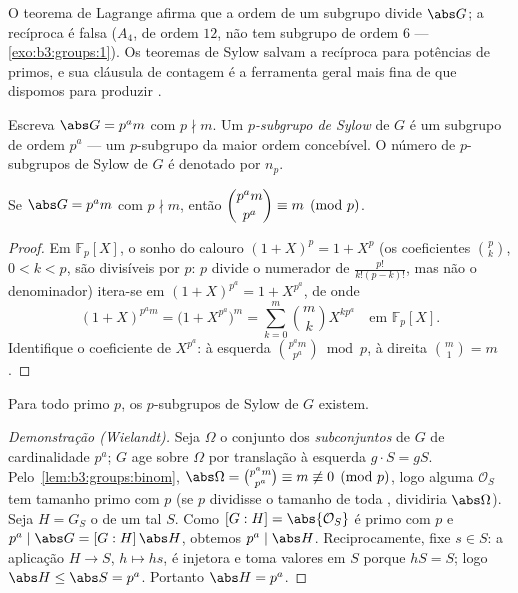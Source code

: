 O teorema de Lagrange afirma que a ordem de um subgrupo divide
$\abs G$; a recíproca é falsa ($A_4$, de ordem $12$, não
tem subgrupo de ordem $6$ --- \cref{exo:b3:groups:1}). Os teoremas de Sylow
salvam a recíproca para potências de primos, e sua cláusula de contagem
é a ferramenta geral mais fina de que dispomos para produzir .

\begin{definition}\label{def:b3:groups:sylow}
Escreva $\abs G = p^a m$ com $p \nmid m$. Um \emph{$p$-subgrupo de
Sylow} de $G$ é um subgrupo de ordem
$p^a$ --- um $p$-subgrupo da maior ordem concebível. O número
de $p$-subgrupos de Sylow de $G$ é denotado por $n_p$.
\end{definition}

\begin{lemma}\label{lem:b3:groups:binom}
Se $\abs G = p^a m$ com $p \nmid m$, então $\dbinom{p^a m}{p^a}
\equiv m \pmod p$.
\end{lemma}

\begin{proof}
Em $\mathbb F_p[X]$, o sonho do calouro $(1+X)^p = 1 + X^p$ (os coeficientes $\binom pk$, $0<k<p$,
são divisíveis por $p$: $p$ divide o numerador de $\frac{p!}{k!(p-k)!}$, mas não
o denominador) itera-se em $(1+X)^{p^a} = 1 + X^{p^a}$, de onde
\[
(1+X)^{p^a m} = \bigl(1 + X^{p^a}\bigr)^m
= \sum_{k=0}^{m} \binom mk X^{k p^a} \quad\text{em } \mathbb
F_p[X].
\]
Identifique o coeficiente de $X^{p^a}$: à esquerda $\binom{p^a
m}{p^a} \bmod p$, à direita $\binom m1 = m$.
\end{proof}

\begin{theorem}\label{thm:b3:groups:sylow1}
Para todo primo $p$, os $p$-subgrupos de Sylow de $G$
existem.
\end{theorem}

\begin{proof}[Demonstração (Wielandt)]
Seja $\Omega$ o conjunto dos \emph{subconjuntos} de $G$ de
cardinalidade $p^a$; $G$ age sobre $\Omega$ por translação
à esquerda $g \cdot S = gS$. Pelo~\cref{lem:b3:groups:binom}, $\abs\Omega = \binom{p^a m}{p^a}
\equiv m \not\equiv 0 \pmod p$, logo alguma  $\mathcal O_S$
tem tamanho primo com $p$ (se $p$ dividisse o tamanho de toda
, dividiria $\abs\Omega$). Seja $H = G_S$ o  de um tal $S$.
Como $[G : H] = \abs{\mathcal O_S}$ é primo com $p$ e $p^a \mid
\abs G = [G:H]\,\abs H$, obtemos $p^a \mid \abs H$. Reciprocamente,
fixe $s \in S$: a aplicação $H \to S$, $h \mapsto hs$, é injetora e toma valores em
$S$ porque $hS = S$; logo $\abs H \leq \abs S = p^a$. Portanto $\abs H = p^a$.
\end{proof}

